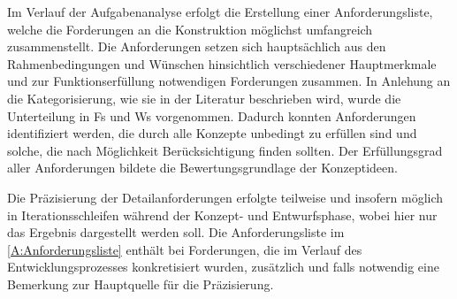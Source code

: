 


Im Verlauf der Aufgabenanalyse erfolgt die Erstellung einer Anforderungsliste, welche die Forderungen an die Konstruktion möglichst umfangreich zusammenstellt. Die Anforderungen setzen sich hauptsächlich aus den Rahmenbedingungen und Wünschen hinsichtlich verschiedener Hauptmerkmale und zur Funktionserfüllung notwendigen Forderungen zusammen. In Anlehung an die Kategorisierung, wie sie in der Literatur beschrieben wird, wurde die Unterteilung in \acp{F} und \acp{W} vorgenommen. Dadurch konnten Anforderungen identifiziert werden, die durch alle Konzepte unbedingt zu erfüllen sind und solche, die nach Möglichkeit Berücksichtigung finden sollten. Der Erfüllungsgrad aller Anforderungen bildete die Bewertungsgrundlage der Konzeptideen.
\par
\vspace{\linespace}
Die Präzisierung der Detailanforderungen erfolgte teilweise und insofern möglich in Iterationsschleifen während der Konzept- und Entwurfsphase, wobei hier nur das Ergebnis dargestellt werden soll. Die Anforderungsliste im \Anhang\ref{A:Anforderungsliste} enthält bei Forderungen, die im Verlauf des Entwicklungsprozesses konkretisiert wurden, zusätzlich und falls notwendig eine Bemerkung zur Hauptquelle für die Präzisierung.





